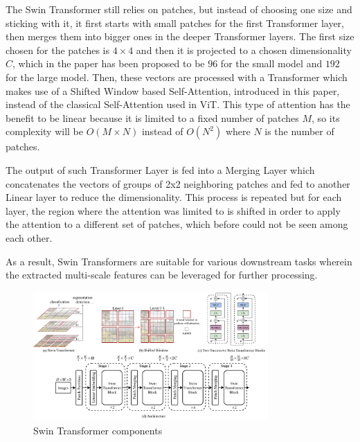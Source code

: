 The Swin Transformer still relies on patches, but instead of choosing one size
and sticking with it, it first starts with small patches for the first
Transformer layer, then merges them into bigger ones in the deeper Transformer
layers. The first size chosen for the patches is $4 \times 4$ and then it is
projected to a chosen dimensionality $C$, which in the paper has been proposed
to be $96$ for the small model and $192$ for the large model. Then, these
vectors are processed with a Transformer which makes use of a Shifted Window
based Self-Attention, introduced in this paper, instead of the classical
Self-Attention used in ViT. This type of attention has the benefit to be linear
because it is limited to a fixed number of patches $M$, so its complexity will
be $O(M \times N)$ instead of $O(N^2)$ where $N$ is the number of patches.

The output of such Transformer Layer is fed into a Merging Layer which
concatenates the vectors of groups of 2x2 neighboring patches and fed to
another Linear layer to reduce the dimensionality.
This process is repeated but for each layer, the region where the attention was
limited to is shifted in order to apply the attention to a different set of
patches, which before could not be seen among each other.

As a result, Swin Transformers are suitable for various downstream tasks wherein
the extracted multi-scale features can be leveraged for further processing.
\begin{figure}[ht!]
  \centering
  \includegraphics[width=0.8\textwidth]{Images/SwinTransformer.png}
  \caption{Swin Transformer components}
  \label{fig:swintransformer}
\end{figure}

